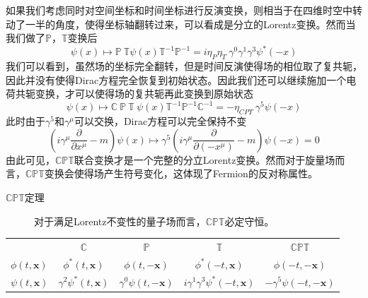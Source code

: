 如果我们考虑同时对空间坐标和时间坐标进行反演变换，则相当于在四维时空中转动了一半的角度，使得坐标轴翻转过来，可以看成是分立的Lorentz变换。然而当我们做了$\mathbb{P}$，$\mathbb{T}$变换后
\begin{equation}
    \psi(x) \mapsto \mathbb{P}~\mathbb{T}\psi(x)\mathbb{T}^{-1}\mathbb{P}^{-1} = i\eta_P \eta_T ~\gamma ^0\gamma^1\gamma^3\psi^*(-x)
\end{equation}
我们可以看到，虽然场的坐标完全翻转，但是时间反演使得场的相位取了复共轭，因此并没有使得Dirac方程完全恢复到初始状态。因此我们还可以继续施加一个电荷共轭变换，才可以使得场的复共轭再此变换到原始状态
\begin{equation}
    \psi(x) \mapsto \mathbb{C}~\mathbb{P}~\mathbb{T}~\psi(x)\mathbb{T}^{-1}\mathbb{P}^{-1}\mathbb{C}^{-1} =-\eta_{CPT} ~\gamma^5\psi(-x)
\end{equation}
此时由于$\gamma^5$和$\gamma^\mu$可以交换，Dirac方程可以完全保持不变
\begin{equation}
    \left(i\gamma^\mu\frac{\partial}{\partial x^\mu} -m\right)\psi(x) \mapsto \gamma^5 \left(i\gamma^\mu\frac{\partial}{\partial (-x^\mu)} -m\right)\psi(-x) =0
\end{equation}
由此可见，$\mathbb{CPT}$联合变换才是一个完整的分立Lorentz变换。然而对于旋量场而言，$\mathbb{CPT}$变换会使得场产生符号变化，这体现了Fermion的反对称属性。
\begin{description}
    \item[$\mathbb{CPT}$定理] 对于满足Lorentz不变性的量子场而言，$\mathbb{CPT}$必定守恒。
\end{description}
\begin{table}[h]
    \centering
    \begin{tabular}{lcccc}
    \hline
         &  $\mathbb{C}$&  $\mathbb{P}$&    $\mathbb{T}$&   $\mathbb{CPT}$\\
         $\phi(t,\boldsymbol{x})$&  $\phi^*(t,\boldsymbol{x})$&   $\phi(t,-\boldsymbol{x})$& $\phi^*(-t,\boldsymbol{x})$& $\phi(-t,-\boldsymbol{x})$\\
         $\psi(t,\boldsymbol{x})$&  $\gamma^2\psi^*(t,\boldsymbol{x})$&   $\gamma^0\psi(t,-\boldsymbol{x})$& $i\gamma^1\gamma^3\psi^*(-t,\boldsymbol{x})$& $-\gamma^5\psi(-t,-\boldsymbol{x})$\\
         \hline
    \end{tabular}
\end{table}

